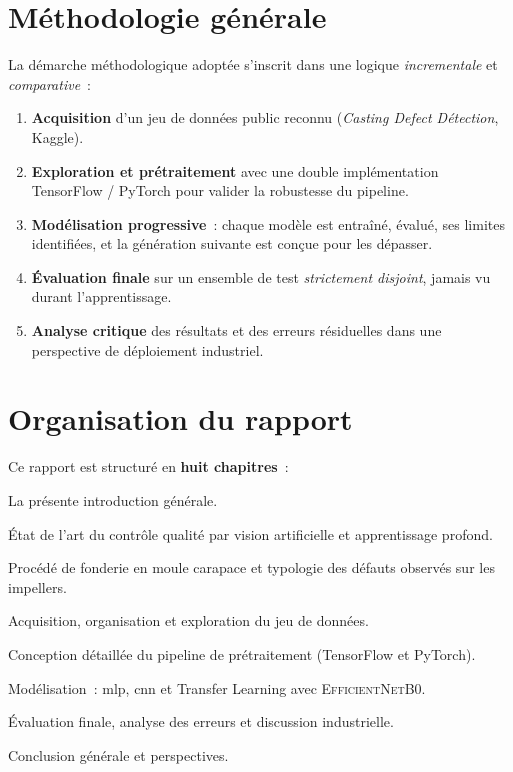\documentclass[12pt,a4paper,openany]{report}
\begin{document}
\section{Méthodologie générale}

La démarche méthodologique adoptée s'inscrit dans une logique \emph{incrementale} et \emph{comparative}~:

\begin{enumerate}
    \item \textbf{Acquisition} d'un jeu de données public reconnu (\emph{Casting Defect Détection}, Kaggle).
    \item \textbf{Exploration et prétraitement} avec une double implémentation TensorFlow / PyTorch pour valider la robustesse du pipeline.
    \item \textbf{Modélisation progressive}~: chaque modèle est entraîné, évalué, ses limites identifiées, et la génération suivante est conçue pour les dépasser.
    \item \textbf{Évaluation finale} sur un ensemble de test \emph{strictement disjoint}, jamais vu durant l'apprentissage.
    \item \textbf{Analyse critique} des résultats et des erreurs résiduelles dans une perspective de déploiement industriel.
\end{enumerate}

\section{Organisation du rapport}

Ce rapport est structuré en \textbf{huit chapitres}~:
\begin{description}[leftmargin=2.2cm,style=nextline]
    \item[Chapitre~1] La présente introduction générale.
    \item[Chapitre~2] État de l'art du contrôle qualité par vision artificielle et apprentissage profond.
    \item[Chapitre~3] Procédé de fonderie en moule carapace et typologie des défauts observés sur les impellers.
    \item[Chapitre~4] Acquisition, organisation et exploration du jeu de données.
    \item[Chapitre~5] Conception détaillée du pipeline de prétraitement (TensorFlow et PyTorch).
    \item[Chapitre~6] Modélisation~: \gls{mlp}, \gls{cnn} et Transfer Learning avec \textsc{EfficientNetB0}.
    \item[Chapitre~7] Évaluation finale, analyse des erreurs et discussion industrielle.
    \item[Chapitre~8] Conclusion générale et perspectives.
\end{description}
\end{document}
